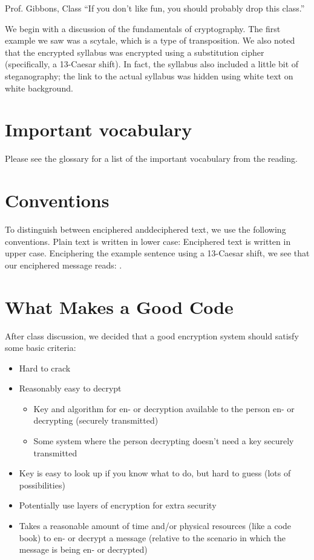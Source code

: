 \begin{chapquote}{Prof. Gibbons, Class}
``If you don't like fun, you should probably drop this class.''
\end{chapquote}

We begin with a discussion of the fundamentals of \gls{cryptography}.  The first example we saw was a \gls{scytale}, which is a type of \gls{transposition}.  We also noted that the encrypted syllabus was encrypted using a \gls{substitution} cipher (specifically, a 13-\gls{Caesar shift}).  In fact, the syllabus also included a little bit of \gls{steganography}; the link to the actual syllabus was hidden using white text on white background.

\section{Important vocabulary}
 
Please see the glossary for a list of the important vocabulary from the reading.

\section{Conventions}
To distinguish between enciphered anddeciphered text, we use the following conventions.  Plain text is written in lower case:   
Enciphered text is written in upper case.  Enciphering the example sentence using a 13-Caesar shift, we see that our enciphered message reads:
{\tt \ex}.


\section{What Makes a Good Code}
After class discussion, we decided that a good encryption system should satisfy some basic criteria:
\begin{itemize}
\item Hard to crack
\item Reasonably easy to decrypt
    \begin{itemize}
    \item Key and algorithm for en- or decryption available to the person en- or decrypting (securely transmitted)
    \item Some system where the person decrypting doesn't need a key securely transmitted
    \end{itemize}
\item Key is easy to look up if you know what to do, but hard to guess (lots of possibilities)
\item Potentially use layers of encryption for extra security
\item Takes a reasonable amount of time and/or physical resources (like a code book) to en- or decrypt a message (relative to the scenario in which the message is being en- or decrypted)
\end{itemize}

